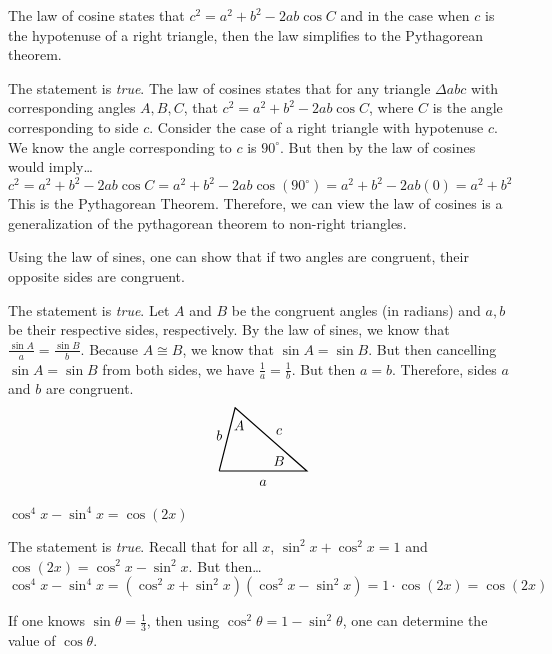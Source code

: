 \documentclass[11pt,letterpaper]{article}
\begin{document}
 The law of cosine states that $c^2= a^2 + b^2 - 2ab \cos C$ and in the case when $c$ is the hypotenuse of a right triangle, then the law simplifies to the Pythagorean theorem. \pspace

\sol The statement is \textit{true}. The law of cosines states that for any triangle $\Delta abc$ with corresponding angles $A, B, C$, that $c^2= a^2 + b^2 - 2ab \cos C$, where $C$ is the angle corresponding to side $c$. Consider the case of a right triangle with hypotenuse $c$. We know the angle corresponding to $c$ is $90^\circ$. But then by the law of cosines would imply\dots
	\[
	c^2= a^2 + b^2 - 2ab \cos C= a^2 + b^2 - 2ab \cos(90^\circ)= a^2 + b^2 - 2ab(0)= a^2 + b^2
	\]
This is the Pythagorean Theorem. Therefore, we can view the law of cosines is a generalization of the pythagorean theorem to non-right triangles. \pvspace{1.3cm}



 Using the law of sines, one can show that if two angles are congruent, their opposite sides are congruent. \pspace

\sol The statement is \textit{true}.  Let $A$ and $B$ be the congruent angles (in radians) and $a, b$ be their respective sides, respectively. By the law of sines, we know that $\frac{\sin A}{a}= \frac{\sin B}{b}$. Because $A \cong B$, we know that $\sin A= \sin B$. But then cancelling $\sin A= \sin B$ from both sides, we have $\frac{1}{a}= \frac{1}{b}$. But then $a= b$. Therefore, sides $a$ and $b$ are congruent. 
	\[
	\begin{tikzpicture}
	\draw[line width=0.03cm] (0,0) -- (2.2,0) -- (0.4,1.6) -- (0,0);
	\node at (1.1,-0.3) {$a$};
	\node at (0,0.9) {$b$};
	\node at (1.5,1.0) {$c$};
	\node at (0.50,1.15) {$A$};
	\node at (1.5,0.25) {$B$};
	\end{tikzpicture}
	\] \pvspace{1.3cm}



 $\cos^4 x - \sin^4 x= \cos(2x)$ \pspace

\sol The statement is \textit{true}. Recall that for all $x$, $\sin^2 x + \cos^2 x= 1$ and $\cos(2x)= \cos^2 x - \sin^2 x$. But then\dots
	\[
	\cos^4 x - \sin^4 x= (\cos^2 x + \sin^2 x)(\cos^2 x - \sin^2 x)= 1 \cdot \cos(2x)= \cos(2x)
	\] \pvspace{1.3cm}



 If one knows $\sin \theta= \frac{1}{3}$, then using $\cos^2 \theta= 1 - \sin^2 \theta$, one can determine the value of $\cos \theta$. \pspace
\end{document}
